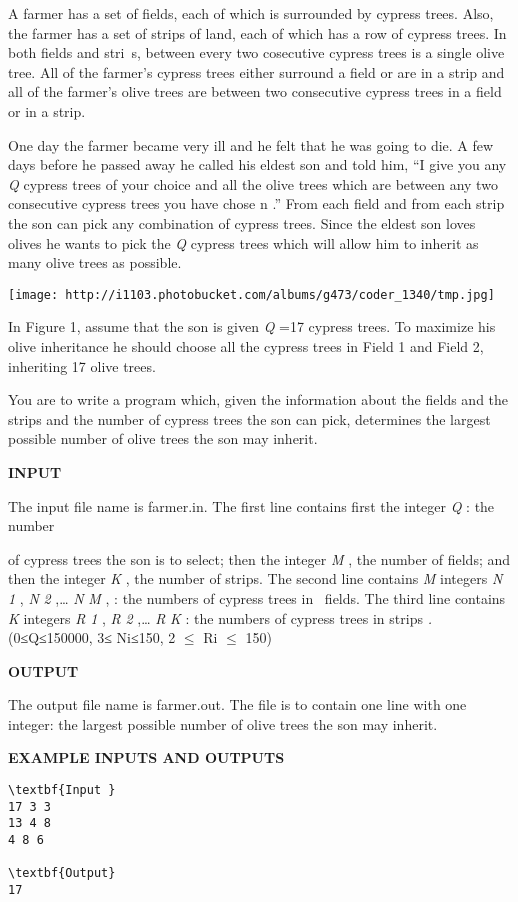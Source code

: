 

A farmer has a set of fields, each of which is surrounded by cypress trees. Also, the farmer has a set of strips of land, each of which has a row of cypress trees. In both fields and stri s, between every two cosecutive cypress trees is a single olive tree. All of the farmer’s cypress trees either surround a field or are in a strip and all of the farmer’s olive trees are between two consecutive cypress trees in a field or in a strip.

One day the farmer became very ill and he felt that he was going to die. A few days before he passed away he called his eldest son and told him, “I give you any \emph{ Q } cypress trees of your choice and all the olive trees which are between any two consecutive cypress trees you have chose n .” From each field and from each strip the son can pick any combination of cypress trees. Since the eldest son loves olives he wants to pick the \emph{ Q } cypress trees which will allow him to inherit as many olive trees as possible.


\texttt{[image: http://i1103.photobucket.com/albums/g473/coder\_1340/tmp.jpg]}

In Figure 1, assume that the son is given \emph{ Q } =17 cypress trees. To maximize his olive inheritance he should choose all the cypress trees in Field 1 and Field 2, inheriting 17 olive trees.

You are to write a program which, given the information about the fields and the strips and the number of cypress trees the son can pick, determines the largest possible number of olive trees the son may inherit.

\textbf{INPUT }

The input file name is farmer.in. The first line contains first the integer \emph{ Q } : the number

of cypress trees the son is to select; then the integer \emph{ M } , the number of fields; and then the integer \emph{ K } , the number of strips. The second line contains \emph{ M } integers \emph{ N }\emph{ 1 } , \emph{ N }\emph{ 2 } ,… \emph{ N }\emph{ M } , : the numbers of cypress trees in  fields. The third line contains \emph{ K } integers \emph{ R }\emph{ 1 } , \emph{ R }\emph{ 2 } ,… \emph{ R }\emph{ K } : the numbers of cypress trees in strips \emph{ . } (0≤Q≤150000, 3≤ Ni≤150, 2 $\le$  Ri $\le$  150)

\textbf{OUTPUT }

The output file name is farmer.out. The file is to contain one line with one integer: the largest possible number of olive trees the son may inherit.

\textbf{EXAMPLE INPUTS AND OUTPUTS }
\begin{verbatim}
\textbf{Input }
17 3 3
13 4 8
4 8 6

\textbf{Output}
17\end{verbatim}
